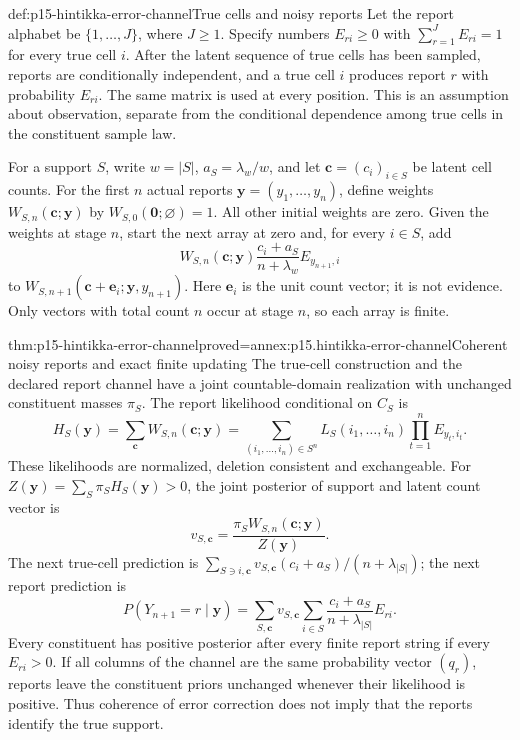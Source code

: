 \begin{hbdefinition}{def:p15-hintikka-error-channel}{True cells and noisy reports}
Let the report alphabet be \(\{1,\ldots,J\}\), where \(J\geq1\).
Specify numbers \(E_{ri}\geq0\) with
\(\sum_{r=1}^J E_{ri}=1\) for every true cell \(i\).
After the latent sequence of true cells has been sampled, reports are
conditionally independent, and a true cell \(i\) produces report \(r\)
with probability \(E_{ri}\). The same matrix is used at every position.
This is an assumption about observation, separate from the conditional
dependence among true cells in the constituent sample law.

For a support \(S\), write \(w=|S|\),
\(a_S=\lambda_w/w\), and let \(\boldsymbol c=(c_i)_{i\in S}\)
be latent cell counts. For the first \(n\) actual reports
\(\boldsymbol y=(y_1,\ldots,y_n)\), define weights
\(W_{S,n}(\boldsymbol c;\boldsymbol y)\) by
\(W_{S,0}(\boldsymbol0;\varnothing)=1\). All other initial weights
are zero. Given the weights at stage \(n\), start the next array at
zero and, for every \(i\in S\), add
\[
 W_{S,n}(\boldsymbol c;\boldsymbol y)
 \frac{c_i+a_S}{n+\lambda_w}E_{y_{n+1},i}
\]
to \(W_{S,n+1}(\boldsymbol c+\boldsymbol e_i;
\boldsymbol y,y_{n+1})\). Here \(\boldsymbol e_i\) is the
unit count vector; it is not evidence. Only vectors with total count
\(n\) occur at stage \(n\), so each array is finite.
\end{hbdefinition}

\begin{hbtheorem}{thm:p15-hintikka-error-channel}{proved=annex:p15.hintikka-error-channel}{Coherent noisy reports and exact finite updating}
The true-cell construction and the declared report channel have a joint
countable-domain realization with unchanged constituent masses \(\pi_S\).
The report likelihood conditional on \(C_S\) is
\[
 H_S(\boldsymbol y)=\sum_{\boldsymbol c}W_{S,n}
       (\boldsymbol c;\boldsymbol y)
 =\sum_{(i_1,\ldots,i_n)\in S^n}
       L_S(i_1,\ldots,i_n)\prod_{t=1}^n E_{y_t,i_t}.
\]
These likelihoods are normalized, deletion consistent and exchangeable.
For \(Z(\boldsymbol y)=\sum_S\pi_SH_S(\boldsymbol y)>0\),
the joint posterior of support and latent count vector is
\[
 v_{S,\boldsymbol c}
   =\frac{\pi_SW_{S,n}(\boldsymbol c;\boldsymbol y)}
                {Z(\boldsymbol y)}.
\]
The next true-cell prediction is
\(\sum_{S\ni i,\boldsymbol c}v_{S,\boldsymbol c}
(c_i+a_S)/(n+\lambda_{|S|})\); the next report prediction is
\[
 P(Y_{n+1}=r\mid\boldsymbol y)
  =\sum_{S,\boldsymbol c}v_{S,\boldsymbol c}
       \sum_{i\in S}\frac{c_i+a_S}{n+\lambda_{|S|}}E_{ri}.
\]
Every constituent has positive posterior after every finite report string
if every \(E_{ri}>0\). If all columns of the channel are the same
probability vector \((q_r)\), reports leave the constituent priors
unchanged whenever their likelihood is positive. Thus coherence of error
correction does not imply that the reports identify the true support.
\end{hbtheorem}

